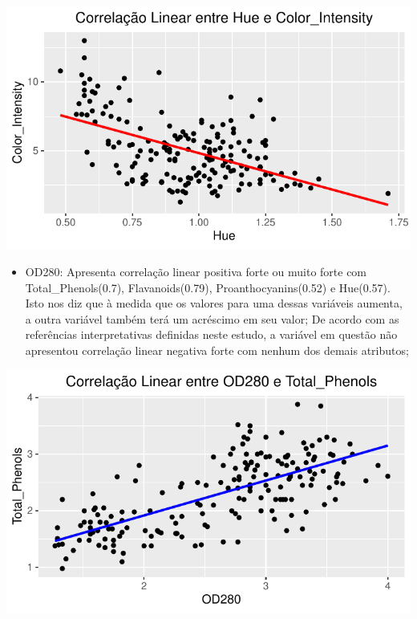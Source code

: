 \documentclass[
  letterpaper,
  DIV=11,
  numbers=noendperiod]{scrartcl}
\providecommand{\tightlist}{%
  \setlength{\itemsep}{0pt}\setlength{\parskip}{0pt}}\usepackage{longtable,booktabs,array}
\begin{document}
\begin{center}
\includegraphics{wines_analysis_files/figure-pdf/unnamed-chunk-15-4.pdf}
\end{center}

\begin{itemize}
\tightlist
\item
  OD280: Apresenta correlação linear positiva forte ou muito forte com
  Total\_Phenols(0.7), Flavanoids(0.79), Proanthocyanins(0.52) e
  Hue(0.57). Isto nos diz que à medida que os valores para uma dessas
  variáveis aumenta, a outra variável também terá um acréscimo em seu
  valor; De acordo com as referências interpretativas definidas neste
  estudo, a variável em questão não apresentou correlação linear
  negativa forte com nenhum dos demais atributos;
\end{itemize}

\begin{center}
\includegraphics{wines_analysis_files/figure-pdf/unnamed-chunk-16-1.pdf}
\end{center}
\end{document}
